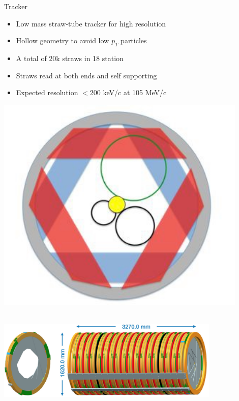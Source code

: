 \documentclass[10pt]{beamer}
\begin{document}
%
\begin{frame}{Tracker}
\begin{minipage}{.65\textwidth}
\begin{itemize}
\setlength\itemsep{0.3cm}
\item Low mass straw-tube tracker for high resolution
\item Hollow geometry to avoid low $p_T$ particles
\item A total of 20k straws in 18 station
\item Straws read at both ends and self supporting
\item Expected resolution $<200$ keV/c at 105 MeV/c
\end{itemize}
\end{minipage}
\begin{minipage}{0.34\textwidth}
\centering
\includegraphics[width=0.9\textwidth]{mu2e_tracker_front}
\end{minipage}\\
\vspace{0.4cm}
\centering
\includegraphics[width=0.8\textwidth]{Tracker_2}
\end{frame}
\end{document}
